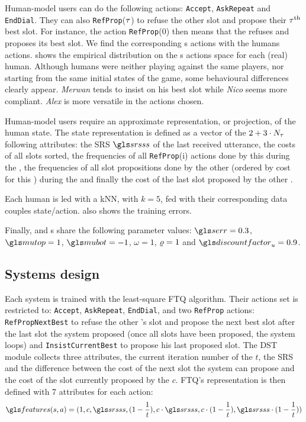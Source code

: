 Human-model users can do the following actions: \texttt{Accept}, \texttt{AskRepeat} and \texttt{EndDial}. They can also \texttt{RefProp}($\tau$) to refuse the other  slot and propose their $\tau^\text{th}$ best slot. For instance, the action \texttt{RefProp}(0) then means that the  refuses and proposes its best slot. We find the corresponding s actions with the humans actions.  shows the empirical distribution on the s actions space for each (real) human. Although humans were neither playing against the same players, nor starting from the same initial states of the game, some behavioural differences clearly appear. \textit{Merwan} tends to insist on his best slot while \textit{Nico} seems more compliant. \textit{Alex} is more versatile in the actions chosen.

Human-model users  require an approximate representation, or projection, of the human state. The  state representation is defined as a vector of the $2 + 3 \cdot N_{\tau}$  following attributes: the \gls{SRS} $\srs$ of the last received utterance, the costs of all slots sorted, the frequencies of all \texttt{RefProp}(i) actions done by this  during the , the frequencies of all slot propositions done by the other  (ordered by cost for this ) during the  and finally the cost of the last slot proposed by the other .

Each human is led with a \gls{kNN}, with $k=5$, fed with their corresponding data couples state/action.  also shows the training errors.

Finally,  and s share the following parameter values: $\ser=0.3$, $\mutop=1$, $\mubot=-1$, $\omega=1$, $\varrho=1$ and $\discountfactor_u = 0.9$.

\subsection{Systems design}
\label{subsection:systemdesign}

Each system is trained with the least-square \gls{FTQ} algorithm. Their actions set is restricted to: \texttt{Accept}, \texttt{AskRepeat}, \texttt{EndDial}, and two \texttt{RefProp} actions: \texttt{RefPropNextBest} to refuse the other 's slot and propose the next best slot after the last slot the system proposed (once all slots have been proposed, the system loops) and \texttt{InsistCurrentBest} to propose his last proposed slot. The \gls{DST} module collects three attributes, the current iteration number of the  $t$, the \gls{SRS} and the difference between the cost of the next slot the system can propose and the cost of the slot currently proposed by the  $c$. \gls{FTQ}'s  representation is then defined with 7 attributes for each action:
\begin{equation*}
    \features(s,a)=(1, c, \srs, (1 - \frac{1}{t}), c \cdot \srs, c \cdot (1 - \frac{1}{t}) , \srs \cdot (1 - \frac{1}{t}))
\end{equation*}

